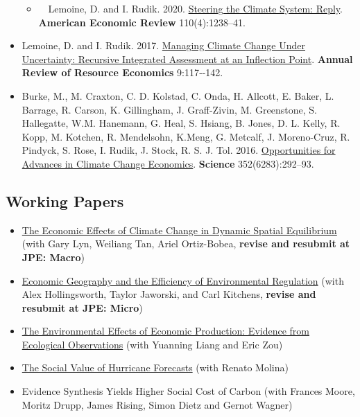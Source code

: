 \documentclass[12pt]{res} %
\begin{document}
\begin{resume}
\begin{itemize}
	\begin{itemize}
		\item[] \,\,\,\, Lemoine, D. and I. Rudik. 2020.  \href{http://papers.ssrn.com/sol3/papers.cfm?abstract_id=2443594}{Steering the Climate System: Reply}. \textbf{American Economic Review} 110(4):1238--41.
	\end{itemize}
	\item[] Lemoine, D. and I. Rudik. 2017. \href{https://papers.ssrn.com/sol3/papers.cfm?abstract_id=2862211}{Managing Climate Change Under Uncertainty: Recursive Integrated Assessment at an Inflection Point}.  \textbf{Annual Review of Resource Economics} 9:117‐-142.
	\item[]  Burke, M., M. Craxton, C. D. Kolstad, C. Onda, H. Allcott, E. Baker, L. Barrage, R. Carson, K. Gillingham, J. Graff-Zivin, M. Greenstone, S. Hallegatte, W.M. Hanemann, G. Heal, S. Hsiang, B. Jones, D. L. Kelly, R. Kopp, M. Kotchen, R. Mendelsohn, K.Meng, G. Metcalf, J. Moreno-Cruz, R. Pindyck, S. Rose, I. Rudik, J. Stock, R. S. J. Tol. 2016. \href{http://science.sciencemag.org/content/352/6283/292.abstract}{Opportunities for Advances in Climate Change Economics}. \textbf{Science} 352(6283):292--93.
\end{itemize} 


\vspace{-.2in}


\subsection{Working Papers}

\begin{itemize} %
	\item[] \href{https://osf.io/preprints/socarxiv/usghb}{The Economic Effects of Climate Change in Dynamic Spatial Equilibrium} (with Gary Lyn, Weiliang Tan, Ariel Ortiz-Bobea, \textbf{revise and resubmit at JPE: Macro})
	\item[]\href{https://osf.io/preprints/socarxiv/x6fuw/}{Economic Geography and the Efficiency of Environmental Regulation} (with Alex Hollingsworth, Taylor Jaworski, and Carl Kitchens, \textbf{revise and resubmit at JPE: Micro})
	\item[] \href{https://osf.io/preprints/socarxiv/qy76a}{The Environmental Effects of Economic Production: Evidence from Ecological Observations} (with Yuanning Liang and Eric Zou)
	\item[] \href{https://ivanrudik.com}{The Social Value of Hurricane Forecasts} (with Renato Molina)
	\item[] Evidence Synthesis Yields Higher Social Cost of Carbon (with Frances Moore, Moritz Drupp, James Rising, Simon Dietz and Gernot Wagner)
\end{itemize}
 

\end{resume}
\end{document}
